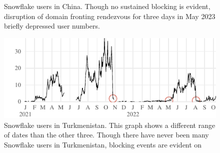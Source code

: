 \documentclass[letterpaper,twocolumn]{article}
\begin{document}
\begin{figure}
{\begin{minipage}[b][\textheight][b]{\linewidth}
\caption{
Snowflake users in China.
Though no sustained blocking is evident,
disruption of domain fronting rendezvous
for three days in May 2023 briefly
depressed user numbers.
\label{fig:client-counts-cn}
}
\vfill
\includegraphics{figures/users/users-tm}
\caption{
Snowflake users in Turkmenistan.
This graph shows a different range of dates than the other three.
Though there have never been many Snowflake users in Turkmenistan,
blocking events are evident on
}
\end{minipage}}
\end{figure}
\end{document}
